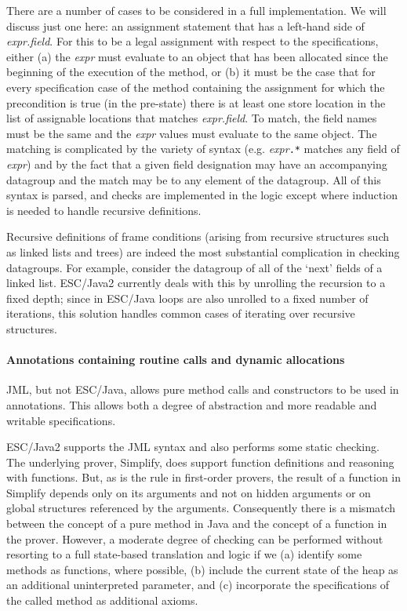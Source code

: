 \documentclass{llncs}
\begin{document}
There are a number of cases to be considered in a full implementation.
We will discuss just one here: an assignment statement that has a
left-hand side of \textit{expr.field}.  For this to be a legal
assignment with respect to the specifications, either (a) the
\textit{expr} must evaluate to an object that has been allocated since
the beginning of the execution of the method, or (b) it must be the
case that for every specification case of the method containing the
assignment for which the precondition is true (in the pre-state) there
is at least one store location in the list of assignable locations
that matches \textit{expr.field}.  To match, the field names must be
the same and the \textit{expr} values must evaluate to the same
object.  The matching is complicated by the variety of syntax (e.g.
\textit{expr}\texttt{.*} matches any field of \textit{expr}) and by
the fact that a given field designation may have an accompanying
datagroup and the match may be to any element of the datagroup.
All of this syntax is parsed, and checks are implemented in the logic except
where induction is needed to handle recursive definitions.

Recursive definitions of frame conditions (arising from recursive structures
such as linked lists and trees) are indeed the most substantial complication 
in checking datagroups.  For example,
consider the datagroup of all of the `next' fields of a linked list.
ESC/Java2 currently deals with this by unrolling the recursion to a
fixed depth; since in ESC/Java loops are also unrolled to a fixed
number of iterations, this solution handles common cases of iterating
over recursive structures.

\paragraph*{Annotations containing routine calls and dynamic allocations}
JML, but not ESC/Java, allows pure method calls and constructors to be
used in annotations.  This allows both a degree of abstraction and
more readable and writable specifications.

ESC/Java2 supports the JML syntax and also performs some static
checking.  The underlying prover, Simplify, does support function
definitions and reasoning with functions.  But, as is the rule in
first-order provers, the result of a function in Simplify depends only on its
arguments and not on hidden arguments or on global structures
referenced by the arguments.  Consequently there is a mismatch between
the concept of a pure method in Java and the concept of a function in
the prover.  However, a moderate degree of checking can be performed
without resorting to a full state-based translation and logic if we
(a) identify some methods as functions, where possible, (b) include
the current state of the heap as an additional uninterpreted
parameter, and (c) incorporate the specifications of the called method
as additional axioms.
\end{document}
